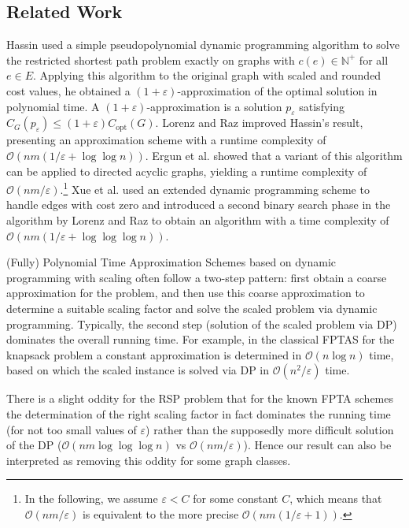 \documentclass[a4paper, 10pt, oneside]{article}
\theoremstyle{plain}
\theoremstyle{definition}
\numberwithin{equation}{section}
\newcommand{\bbN}{\mathbb{N}}
\newcommand{\calO}{\mathcal{O}}
\newcommand{\compLeq}[1]{\calO\left( #1 \right)}
\newcommand{\copt}{C_{\mathrm{opt}}}
\newcommand{\natOne}{\bbN^+}
\begin{document}
\subsection{Related Work}
Hassin \cite{hassin1992} used a simple pseudopolynomial dynamic programming algorithm to solve the restricted shortest path problem exactly on graphs with $c(e) \in \natOne$ for all $e \in E$. Applying this algorithm to the original graph with scaled and rounded cost values, he obtained a $(1 + \varepsilon)$-approximation of the optimal solution in polynomial time. A $(1 + \varepsilon)$-approximation is a solution $p_\varepsilon$ satisfying $C_G(p_\varepsilon) \leq (1 + \varepsilon)\copt(G)$. Lorenz and Raz \cite{lorenz2001} improved Hassin's result, presenting an approximation scheme with a runtime complexity of $\compLeq{nm(1/\varepsilon + \log \log n)}$. Ergun et al. \cite{ergun2002} showed that a variant of this algorithm can be applied to directed acyclic graphs, yielding a runtime complexity of $\compLeq{nm/\varepsilon}$.\footnote{In the following, we assume $\varepsilon < C$ for some constant $C$, which means that $\compLeq{nm/\varepsilon}$ is equivalent to the more precise $\compLeq{nm(1/\varepsilon + 1)}$.} Xue et al. \cite{xue2008} used an extended dynamic programming scheme to handle edges with cost zero and introduced a second binary search phase in the algorithm by Lorenz and Raz \cite{lorenz2001} to obtain an algorithm with a time complexity of $\compLeq{nm(1/\varepsilon + \log \log \log n)}$. %

(Fully) Polynomial Time Approximation Schemes based on dynamic
programming with scaling often follow a two-step pattern: first obtain a
coarse approximation for the problem, and then use this coarse
approximation to determine a suitable scaling factor and solve the
scaled problem via dynamic programming. Typically, the second step
(solution of the scaled problem via DP) dominates the overall running
time. For example, in the classical FPTAS for the knapsack problem a
constant approximation is determined in $\compLeq{n \log n}$ time, based on which
the scaled instance is solved via DP in $\compLeq{n^2/\varepsilon}$ time.

There is a slight oddity for the RSP problem that for the known FPTA
schemes  the determination of the right scaling factor in fact dominates
the running time (for not too small values of $\varepsilon$) rather than the
supposedly more difficult solution of the DP ($\compLeq{nm \log \log \log n}$ vs
$\compLeq{nm/\varepsilon}$). Hence our result can also be interpreted as removing this
oddity for some graph classes.
\end{document}
